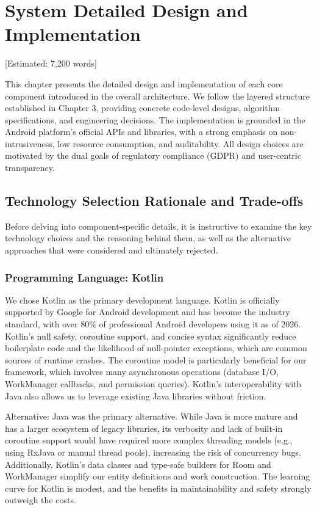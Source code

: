 \newpage\section{System Detailed Design and Implementation} [Estimated: 7,200 words]

This chapter presents the detailed design and implementation of each core component introduced in the overall architecture. We follow the layered structure established in Chapter 3, providing concrete code-level designs, algorithm specifications, and engineering decisions. The implementation is grounded in the Android platform's official APIs and libraries, with a strong emphasis on non-intrusiveness, low resource consumption, and auditability. All design choices are motivated by the dual goals of regulatory compliance (GDPR) and user-centric transparency.

\subsection{Technology Selection Rationale and Trade-offs}

Before delving into component-specific details, it is instructive to examine the key technology choices and the reasoning behind them, as well as the alternative approaches that were considered and ultimately rejected.

\subsubsection{Programming Language: Kotlin}

We chose Kotlin as the primary development language. Kotlin is officially supported by Google for Android development and has become the industry standard, with over 80\% of professional Android developers using it as of 2026. Kotlin's null safety, coroutine support, and concise syntax significantly reduce boilerplate code and the likelihood of null-pointer exceptions, which are common sources of runtime crashes. The coroutine model is particularly beneficial for our framework, which involves many asynchronous operations (database I/O, WorkManager callbacks, and permission queries). Kotlin's interoperability with Java also allows us to leverage existing Java libraries without friction.

Alternative: Java was the primary alternative. While Java is more mature and has a larger ecosystem of legacy libraries, its verbosity and lack of built-in coroutine support would have required more complex threading models (e.g., using RxJava or manual thread pools), increasing the risk of concurrency bugs. Additionally, Kotlin's data classes and type-safe builders for Room and WorkManager simplify our entity definitions and work construction. The learning curve for Kotlin is modest, and the benefits in maintainability and safety strongly outweigh the costs.


